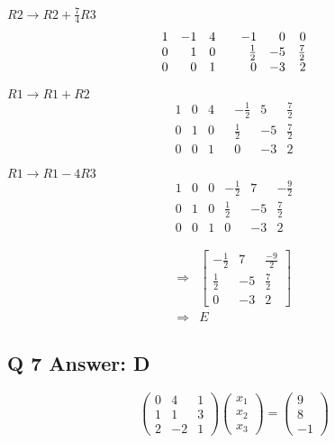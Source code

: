 \documentclass[a4paper,11pt]{article}
\begin{document}
\( R2 \rightarrow R2 + \frac{7}{4} R3 \)
\[\begin{array}{rrr rrrr} 1 & -1 & 4 && -1 & 0 & 0 \\ 0 & 1 & 0 && \frac{1}{2} & -5 & \frac{7}{2} \\ 0 & 0 & 1 && 0 & -3 & 2\end{array}\]

\( R1 \rightarrow R1 + R2  \)
\[\begin{array}{rrrrrrr} 1 & 0 & 4 && -\frac{1}{2} & 5 & \frac{7}{2} \\ [2mm] 0 & 1 & 0 && \frac{1}{2} & -5 & \frac{7}{2} \\ [2mm]
0 & 0 & 1 && 0 & -3 & 2\end{array}\]

\( R1 \rightarrow R1 - 4R3 \)
\[\begin{array}{rrr|rrr} 1 & 0 & 0 & -\frac{1}{2} & 7 & -\frac{9}{2} \\ [2mm] 0 & 1 & 0 & \frac{1}{2} & -5 & \frac{7}{2} \\ [2mm] 0 & 0 & 1 & 0 & -3 & 2 \end{array}\]

\[ \begin{array}{rl}
\Rightarrow & \left[\begin{array}{rrr} -\frac{1}{2} & 7 & \frac{-9}{2} \\ [2mm] \frac{1}{2} & -5 & \frac{7}{2} \\ [2mm] 0 & -3 & 2 \end{array}\right] \\ [8mm]
\Rightarrow & \boxed{E}
\end{array}\]

\clearpage
\subsection*{Q 7 Answer: D}

\[\begin{pmatrix} 0 & 4 & 1 \\ 1 & 1 & 3 \\ 2 & -2 & 1 \end{pmatrix} \begin{pmatrix} x_1 \\ x_2 \\ x_3\end{pmatrix} = \begin{pmatrix} 9 \\ 8 \\ -1\end{pmatrix}\]
\end{document}
